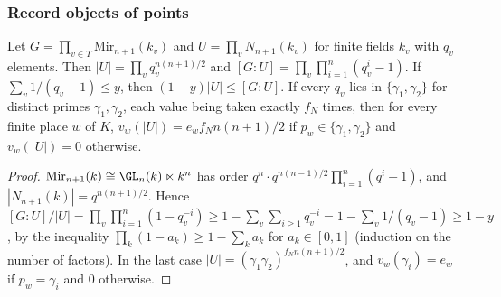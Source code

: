 \subsubsection{Record objects of points}

\begin{lemma}\label{pf:onto3:mirorders}
Let $G=\prod_{v\in\Upsilon}\mathrm{Mir}_{n+1}(k_v)$ and $U=\prod_vN_{n+1}(k_v)$ for finite fields $k_v$ with
$q_v$ elements. Then $|U|=\prod_vq_v^{n(n+1)/2}$ and $[G:U]=\prod_v\prod_{i=1}^n(q_v^i-1)$. If
$\sum_v1/(q_v-1)\le y$, then $(1-y)|U|\le[G:U]$. If every $q_v$ lies in $\{\gamma_1,\gamma_2\}$ for distinct
primes $\gamma_1,\gamma_2$, each value being taken exactly $f_N$ times, then for every finite place $w$ of $K$,
$v_w(|U|)=e_w f_Nn(n+1)/2$ if $p_w\in\{\gamma_1,\gamma_2\}$ and $v_w(|U|)=0$ otherwise.
\end{lemma}

\begin{proof}
$\mathrm{Mir}_{n+1}(k)\cong\GL_n(k)\ltimes k^n$ has order $q^n\cdot q^{n(n-1)/2}\prod_{i=1}^n(q^i-1)$, and
$|N_{n+1}(k)|=q^{n(n+1)/2}$. Hence $[G:U]/|U|=\prod_v\prod_{i=1}^n(1-q_v^{-i})\ge1-\sum_v\sum_{i\ge1}q_v^{-i}=
1-\sum_v1/(q_v-1)\ge1-y$, by the inequality $\prod_k(1-a_k)\ge1-\sum_ka_k$ for $a_k\in[0,1]$ (induction on the
number of factors). In the last case $|U|=(\gamma_1\gamma_2)^{f_Nn(n+1)/2}$, and $v_w(\gamma_i)=e_w$ if
$p_w=\gamma_i$ and $0$ otherwise.
\end{proof}

